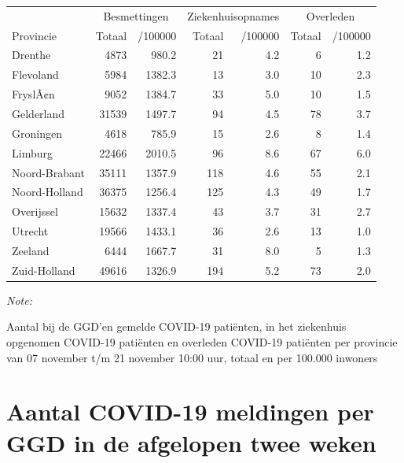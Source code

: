 \documentclass[
  english,
  man,floatsintext]{apa6}
\begin{document}
\begin{table}
\centering
\begin{threeparttable}
\begin{tabular}{lrrrrrr}
\toprule
\multicolumn{1}{c}{ } & \multicolumn{2}{c}{Besmettingen} & \multicolumn{2}{c}{Ziekenhuisopnames} & \multicolumn{2}{c}{Overleden} \\
\cmidrule(l{3pt}r{3pt}){2-3} \cmidrule(l{3pt}r{3pt}){4-5} \cmidrule(l{3pt}r{3pt}){6-7}
Provincie & Totaal & /100000 & Totaal & /100000 & Totaal & /100000\\
\midrule
Drenthe & 4873 & 980.2 & 21 & 4.2 & 6 & 1.2\\
Flevoland & 5984 & 1382.3 & 13 & 3.0 & 10 & 2.3\\
FryslÃ¢n & 9052 & 1384.7 & 33 & 5.0 & 10 & 1.5\\
Gelderland & 31539 & 1497.7 & 94 & 4.5 & 78 & 3.7\\
Groningen & 4618 & 785.9 & 15 & 2.6 & 8 & 1.4\\
Limburg & 22466 & 2010.5 & 96 & 8.6 & 67 & 6.0\\
Noord-Brabant & 35111 & 1357.9 & 118 & 4.6 & 55 & 2.1\\
Noord-Holland & 36375 & 1256.4 & 125 & 4.3 & 49 & 1.7\\
Overijssel & 15632 & 1337.4 & 43 & 3.7 & 31 & 2.7\\
Utrecht & 19566 & 1433.1 & 36 & 2.6 & 13 & 1.0\\
Zeeland & 6444 & 1667.7 & 31 & 8.0 & 5 & 1.3\\
Zuid-Holland & 49616 & 1326.9 & 194 & 5.2 & 73 & 2.0\\
\bottomrule
\end{tabular}
\begin{tablenotes}
\item \textit{Note: } 
\item Aantal bij de GGD’en gemelde COVID-19 patiënten, in het ziekenhuis opgenomen COVID-19 patiënten en overleden COVID-19 patiënten per provincie van 07 november t/m 21 november 10:00 uur, totaal en per 100.000 inwoners
\end{tablenotes}
\end{threeparttable}
\end{table}

\newpage

\hypertarget{aantal-covid-19-meldingen-per-ggd-in-de-afgelopen-twee-weken}{%
\section{Aantal COVID-19 meldingen per GGD in de afgelopen twee weken}\label{aantal-covid-19-meldingen-per-ggd-in-de-afgelopen-twee-weken}}
\end{document}
